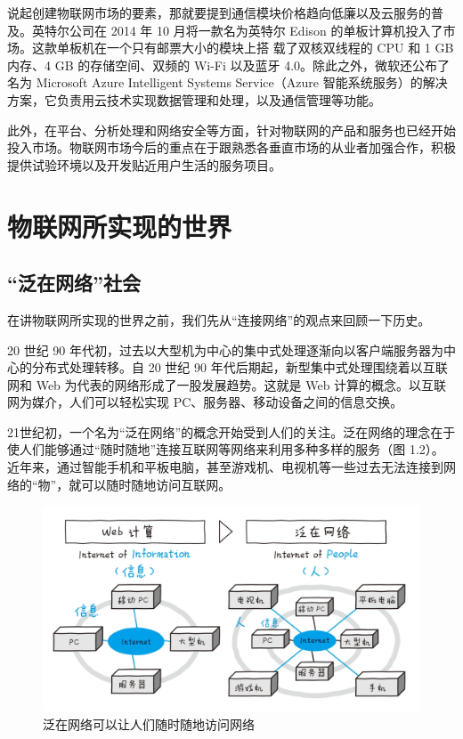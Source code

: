 \documentclass[12pt,UTF8]{ctexbook}
\begin{document}
说起创建物联网市场的要素，那就要提到通信模块价格趋向低廉以及云服务的普及。英特尔公司在 2014 年 10 月将一款名为英特尔 Edison 的单板计算机投入了市场。这款单板机在一个只有邮票大小的模块上搭
载了双核双线程的 CPU 和 1 GB 内存、4 GB 的存储空间、双频的 Wi-Fi 以及蓝牙 4.0。除此之外，微软还公布了名为 Microsoft Azure Intelligent Systems Service（Azure 智能系统服务）的解决方案，它负责用云技术实现数据管理和处理，以及通信管理等功能。

此外，在平台、分析处理和网络安全等方面，针对物联网的产品和服务也已经开始投入市场。物联网市场今后的重点在于跟熟悉各垂直市场的从业者加强合作，积极提供试验环境以及开发贴近用户生活的服务项目。

\section{物联网所实现的世界}

\subsection{“泛在网络”社会}

在讲物联网所实现的世界之前，我们先从“连接网络”的观点来回顾一下历史。

20 世纪 90 年代初，过去以大型机为中心的集中式处理逐渐向以客户端服务器为中心的分布式处理转移。自 20 世纪 90 年代后期起，新型集中式处理围绕着以互联网和 Web 为代表的网络形成了一股发展趋势。这就是 Web 计算的概念。以互联网为媒介，人们可以轻松实现 PC、服务器、移动设备之间的信息交换。

21世纪初，一个名为“泛在网络”的概念开始受到人们的关注。泛在网络的理念在于使人们能够通过“随时随地”连接互联网等网络来利用多种多样的服务（图 1.2）。近年来，通过智能手机和平板电脑，甚至游戏机、电视机等一些过去无法连接到网络的“物”，就可以随时随地访问互联网。

\begin{figure}[htbp]
	\centering
	\includegraphics[width=1\linewidth]{2}
	\caption{泛在网络可以让人们随时随地访问网络}
	\label{fig:1}
\end{figure}
\end{document}
